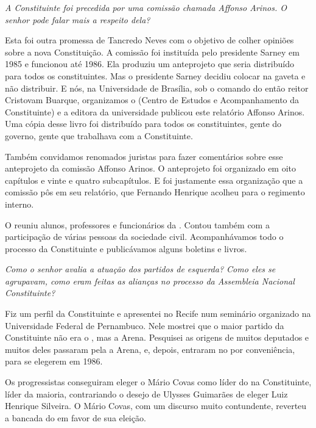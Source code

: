 \medskip

\noindent\emph{A Constituinte foi precedida por uma comissão chamada Affonso
Arinos. O senhor pode falar mais a respeito dela?}

Esta foi outra promessa de Tancredo Neves com o
objetivo de colher opiniões sobre a nova Constituição. A comissão foi
instituída pelo presidente Sarney em 1985 e funcionou até 1986. Ela
produziu um anteprojeto que seria distribuído para todos os
constituintes. Mas o presidente Sarney decidiu colocar na gaveta e não
distribuir. E nós, na Universidade de Brasília, sob o comando do então
reitor Cristovam Buarque, organizamos o  (Centro de Estudos e
Acompanhamento da Constituinte) e a editora da universidade publicou
este relatório Affonso Arinos. Uma cópia desse livro foi distribuído
para todos os constituintes, gente do governo, gente que trabalhava com
a Constituinte.

Também convidamos renomados juristas para fazer comentários sobre esse
anteprojeto da comissão Affonso Arinos. O anteprojeto foi organizado em
oito capítulos e vinte e quatro subcapítulos. E foi justamente essa
organização que a comissão pôs em seu relatório, que Fernando Henrique
acolheu para o regimento interno.

O  reuniu alunos, professores e funcionários da . Contou também
com a participação de várias pessoas da sociedade civil. Acompanhávamos
todo o processo da Constituinte e publicávamos alguns boletins e livros.

\medskip

\noindent\emph{Como o senhor avalia a atuação dos partidos de esquerda? Como
eles se agrupavam, como eram feitas as alianças no processo da
Assembleia Nacional Constituinte?}

Fiz um perfil da Constituinte e apresentei no Recife
num seminário organizado na Universidade Federal de Pernambuco. Nele
mostrei que o maior partido da Constituinte não era o , mas a Arena.
Pesquisei as origens de muitos deputados e muitos deles passaram pela a
Arena,  e, depois, entraram no  por conveniência, para se
elegerem em 1986.

Os progressistas conseguiram eleger o Mário Covas como líder do  na
Constituinte, líder da maioria, contrariando o desejo de Ulysses
Guimarães de eleger Luiz Henrique Silveira. O Mário Covas, com um
discurso muito contundente, reverteu a bancada do  em favor de sua
eleição.

